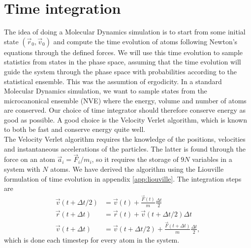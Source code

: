 \section{Time integration}
The idea of doing a Molecular Dynamics simulation is to start from some initial state $(\vec r_0, \vec v_0)$ and compute the time evolution of atoms following Newton's equations through the defined forces. We will use this time evolution to sample statistics from states in the phase space, assuming that the time evolution will guide the system through the phase space with probabilities according to the statistical ensemble. This was the assumtion of ergodicity. In a standard Molecular Dynamics simulation, we want to sample states from the microcanonical ensemble (NVE) where the energy, volume and number of atoms are conserved. Our choice of time integrator should therefore conserve energy as good as possible. A good choice is the Velocity Verlet algorithm, which is known to both be fast and conserve energy quite well\cite{frenkel2001understanding}.\\
The Velocity Verlet algorithm requires the knowledge of the positions, velocities and instantaneous accelerations of the particles. The latter is found through the force on an atom $\vec a_i = \vec F_i/m_i$, so it requires the storage of $9N$ variables in a system with $N$ atoms. We have derived the algorithm using the Liouville formulation of time evolution in appendix \ref{app:liouville}. The integration steps are
\begin{align}
	\vec v(t + \Delta t/2) &= \vec v(t) + \frac{\vec F(t)}{m}\frac{\Delta t}{2}\\
	\vec r(t + \Delta t) &= \vec r(t) + \vec v(t + \Delta t/2)\Delta t\\
	\vec v(t + \Delta t) &= \vec v(t + \Delta t/2) + \frac{\vec F(t + \Delta t)}{m}\frac{\Delta t}{2},
\end{align}
which is done each timestep for every atom in the system.